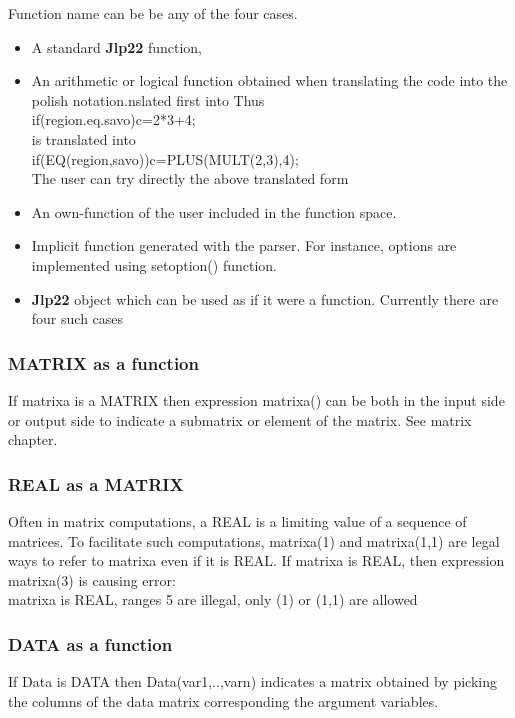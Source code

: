 Function name can be be any of the four cases.
\begin{itemize}

\item A standard \textbf{Jlp22} function,
\item An arithmetic or logical function obtained when translating the code into the polish notation.nslated first into
Thus \\
\textcolor{VioletRed}{if}(region.eq.savo)c=2*3+4;\\
is translated into \\
\textcolor{VioletRed}{if}(\textcolor{VioletRed}{EQ}(region,savo))c=\textcolor{VioletRed}{PLUS}(\textcolor{VioletRed}{MULT}(2,3),4);\\
The user can try directly the above translated form
\item An own-function of the user included in the function space.

\item Implicit function generated with the parser. For instance, options are implemented using
\textcolor{VioletRed}{setoption}() function.
\item \textbf{Jlp22} object which can be used as if it were a function. Currently there
are four such cases
\end{itemize}
\subsubsection{MATRIX as a function}
\label{matrixfunc}
If matrixa is a MATRIX then expression matrixa() can be both in the input side or output side to indicate
a submatrix or element of the matrix. See matrix chapter.
\subsubsection{REAL as a MATRIX}
\label{realmatrix}
Often in matrix computations, a REAL is a limiting value of a sequence of matrices.
To facilitate such computations, matrixa(1) and matrixa(1,1) are legal ways to refer to matrixa even if it is REAL.
If matrixa is REAL, then expression matrixa(3) is causing error:\\
matrixa is REAL, ranges            5  are illegal, only (1) or (1,1) are allowed
\subsubsection{DATA as a function}
\label{datafunc}
If Data is  DATA then Data(var1,..,varn) indicates a matrix obtained by picking
the columns of the data matrix corresponding the argument variables.
